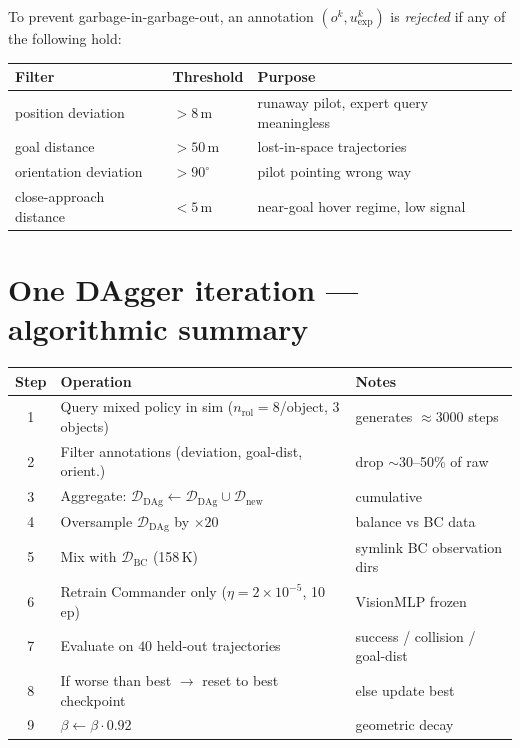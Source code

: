 \documentclass[11pt, a4paper]{article}
\newcommand{\D}{\mathcal{D}}
\begin{document}
To prevent garbage-in-garbage-out, an annotation $(o^k, u^k_{\text{exp}})$
is \emph{rejected} if any of the following hold:

\begin{center}
\begin{tabular}{lll}
\toprule
\textbf{Filter} & \textbf{Threshold} & \textbf{Purpose} \\
\midrule
position deviation         & $> 8$\,m   & runaway pilot, expert query meaningless \\
goal distance              & $> 50$\,m  & lost-in-space trajectories \\
orientation deviation      & $> 90^\circ$ & pilot pointing wrong way \\
close-approach distance    & $< 5$\,m   & near-goal hover regime, low signal \\
\bottomrule
\end{tabular}
\end{center}

\section{One DAgger iteration --- algorithmic summary}

\begin{center}
\begin{tabular}{cll}
\toprule
\textbf{Step} & \textbf{Operation} & \textbf{Notes} \\
\midrule
1 & Query mixed policy in sim ($n_{\text{rol}}{=}8$/object, 3 objects)
  & generates $\approx 3000$ steps \\
2 & Filter annotations (deviation, goal-dist, orient.)
  & drop $\sim$30--50\% of raw \\
3 & Aggregate: $\D_{\text{DAg}} \leftarrow \D_{\text{DAg}} \cup \D_{\text{new}}$
  & cumulative \\
4 & Oversample $\D_{\text{DAg}}$ by $\times 20$
  & balance vs BC data \\
5 & Mix with $\D_{\text{BC}}$ (158\,K)
  & symlink BC observation dirs \\
6 & Retrain Commander only ($\eta=2{\times}10^{-5}$, 10\,ep)
  & VisionMLP frozen \\
7 & Evaluate on $40$ held-out trajectories
  & success / collision / goal-dist \\
8 & If worse than best $\to$ reset to best checkpoint
  & else update best \\
9 & $\beta \leftarrow \beta \cdot 0.92$
  & geometric decay \\
\bottomrule
\end{tabular}
\end{center}
\end{document}
